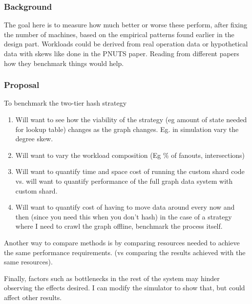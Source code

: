 \documentclass{article}
\begin{document}
\subsubsection{Background}
The goal here is to measure how much better or worse these perform, after fixing the number of machines, based on the empirical patterns found earlier in the design part.  Workloads could be derived from real operation data or hypothetical data with skews like done in the PNUTS paper. Reading from different papers how they benchmark things would help.
\subsubsection{Proposal}


To benchmark the two-tier hash strategy 

\begin{enumerate}
\item Will want to see how the viability of the strategy (eg amount of state needed for lookup table) changes as the graph changes. Eg. in simulation vary the degree skew.
\item Will want to vary the workload composition (Eg \% of fanouts, intersections)
\item Will want to quantify time and space cost of running the custom shard code vs. will want to quantify performance of the full graph data system  with custom shard.
\item Will want to quantify cost of having to move data around every now and then (since you need this when you don't hash)
in the case of a strategy where I need to crawl the graph offline, benchmark the process itself.
\end{enumerate}

Another way to compare methods is by comparing resources needed to achieve the same  performance requirements. (vs comparing the results achieved with the same resources).

Finally, factors such as bottlenecks in the rest of the system may hinder observing the effects desired. I can modify the simulator to show that, but could affect other results.
\end{document}
